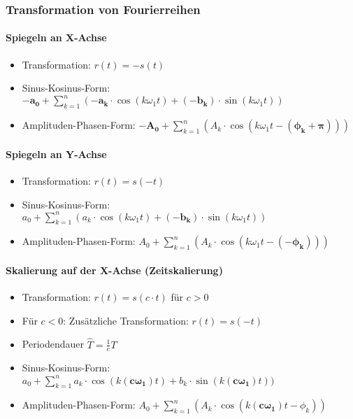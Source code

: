 \subsubsection{Transformation von Fourierreihen}
\paragraph{Spiegeln an X-Achse}
\begin{itemize}
  \item Transformation: $r(t) = -s(t)$
  \item Sinus-Kosinus-Form: $\boldsymbol{-a_0} + \sum_{k=1}^{n}
    (\boldsymbol{-a_k} \cdot \cos(k \omega_1 t) +
    \boldsymbol{(-b_k)} \cdot \sin(k \omega_1 t))$
  \item Amplituden-Phasen-Form: $\boldsymbol{-A_0} + \sum_{k=1}^{n}
    (A_k \cdot \cos(k \omega_1 t  - \boldsymbol{(\phi_k + \pi)}))$
\end{itemize}
\paragraph{Spiegeln an Y-Achse}
\begin{itemize}
  \item Transformation: $r(t) = s(-t)$
  \item Sinus-Kosinus-Form: $a_0 + \sum_{k=1}^{n} ( a_k \cdot
    \cos(k \omega_1 t) + \boldsymbol{(-b_k)} \cdot \sin(k \omega_1 t))$
  \item Amplituden-Phasen-Form: $A_0 + \sum_{k=1}^{n}
    (A_k \cdot \cos(k \omega_1 t  - \boldsymbol{(-\phi_k)}))$
\end{itemize}
\paragraph{Skalierung auf der X-Achse (Zeitskalierung)}
\begin{itemize}
  \item Transformation: $r(t) = s(c \cdot t)$ für $c > 0$
  \item Für $c < 0$: Zusätzliche Transformation: $r(t) = s(-t)$
  \item Periodendauer $\hat{T} = \frac{1}{c}T$
  \item Sinus-Kosinus-Form: $a_0 + \sum_{k=1}^{n}
    a_k \cdot \cos(k \boldsymbol{(c \omega_1)} t) +
    b_k \cdot \sin(k \boldsymbol{(c \omega_1)} t))$
  \item Amplituden-Phasen-Form: $A_0 + \sum_{k=1}^{n}
    (A_k \cdot \cos(k \boldsymbol{(c \omega_1)} t  - \phi_k))$
\end{itemize}
